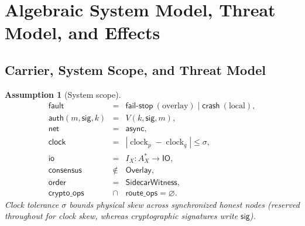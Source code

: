 \documentclass[journal]{IEEEtran}
\newtheorem{assumption}{Assumption}
\begin{document}
\section{Algebraic System Model, Threat Model, and Effects}\label{sec:algebraic-model}

\subsection{Carrier, System Scope, and Threat Model}

\begin{assumption}[System scope]
\[
\begin{array}{rcl}
\mathsf{fault}&=&\mathsf{fail\mbox{-}stop}\ (\text{overlay}) \mid \mathsf{crash}\ (\text{local}),\\
\mathsf{auth}(m,\mathsf{sig},k)&=&V(k,\mathsf{sig},m),\\
\mathsf{net}&=&\mathsf{async},\\
\mathsf{clock}&=&|\operatorname{clock}_p-\operatorname{clock}_q|\le\sigma,\\
\mathsf{io}&=&I_X:A_X^*\to\mathsf{IO},\\
\mathsf{consensus}&\notin&\mathsf{Overlay},\\
\mathsf{order}&=&\mathsf{SidecarWitness},\\
\mathsf{crypto\_ops}&\cap&\mathsf{route\_ops}=\varnothing.
\end{array}
\]
Clock tolerance $\sigma$ bounds physical skew across synchronized honest nodes (reserved throughout for clock skew, whereas cryptographic signatures write $\mathsf{sig}$).
\end{assumption}
\end{document}
